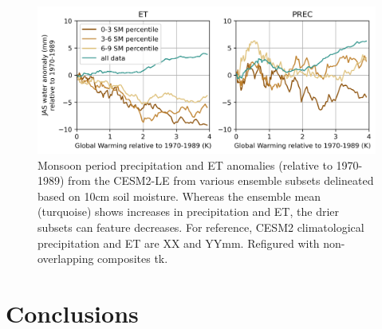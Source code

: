 \documentclass[draft]{agujournal2019}
\begin{document}
\begin{figure}
\includegraphics[width=40pc]{../figs/main/cesm2le_water_anomalies.png}
\caption{Monsoon period precipitation and ET anomalies (relative to 1970-1989) from the CESM2-LE from various ensemble subsets delineated based on 10cm soil moisture. Whereas the ensemble mean (turquoise) shows increases in precipitation and ET, the drier subsets can feature decreases. For reference, CESM2 climatological precipitation and ET are XX and YYmm. Refigured with non-overlapping composites tk.}
\end{figure}



\section{Conclusions}





%
%
\end{document}
